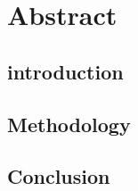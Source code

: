 
\section*{Abstract}

\subsection*{introduction}
\subsection*{Methodology}
\subsection*{Conclusion}
